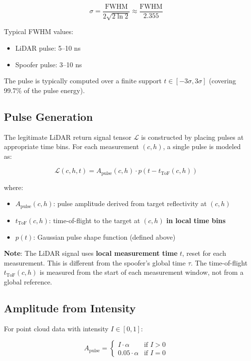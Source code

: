 \documentclass[11pt]{article}
\begin{document}
\begin{equation}
\sigma = \frac{\text{FWHM}}{2\sqrt{2\ln 2}} \approx \frac{\text{FWHM}}{2.355}
\end{equation}

Typical FWHM values:
\begin{itemize}
    \item LiDAR pulse: 5--10 ns
    \item Spoofer pulse: 3--10 ns
\end{itemize}

The pulse is typically computed over a finite support $t \in [-3\sigma, 3\sigma]$ (covering 99.7\% of the pulse energy).

\subsection{Pulse Generation}

The legitimate LiDAR return signal tensor $\bm{\mathcal{L}}$ is constructed by placing pulses at appropriate time bins. For each measurement $(c, h)$, a single pulse is modeled as:

\begin{equation}
\mathcal{L}(c, h, t) = A_{\text{pulse}}(c, h) \cdot p(t - t_{\text{ToF}}(c, h))
\end{equation}

where:
\begin{itemize}
    \item $A_{\text{pulse}}(c, h)$: pulse amplitude derived from target reflectivity at $(c, h)$
    \item $t_{\text{ToF}}(c, h)$: time-of-flight to the target at $(c, h)$ \textbf{in local time bins}
    \item $p(t)$: Gaussian pulse shape function (defined above)
\end{itemize}

\textbf{Note}: The LiDAR signal uses \textbf{local measurement time} $t$, reset for each measurement. This is different from the spoofer's global time $\tau$. The time-of-flight $t_{\text{ToF}}(c, h)$ is measured from the start of each measurement window, not from a global reference.

\subsection{Amplitude from Intensity}

For point cloud data with intensity $I \in [0, 1]$:

\begin{equation}
A_{\text{pulse}} = \begin{cases}
I \cdot \alpha & \text{if } I > 0 \\
0.05 \cdot \alpha & \text{if } I = 0
\end{cases}
\end{equation}
\end{document}
